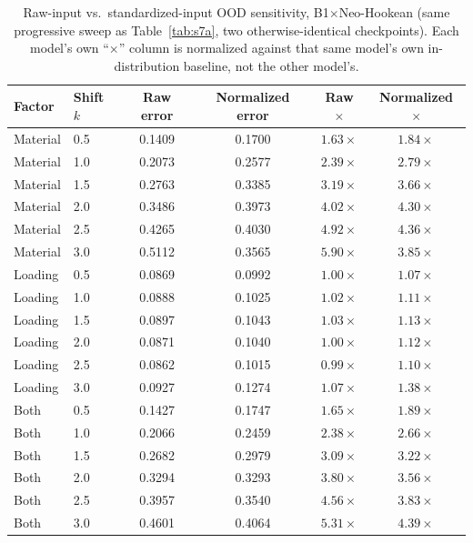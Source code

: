 \documentclass[11pt]{article}
\begin{document}
\begin{table}[h]
\centering
\caption{Raw-input vs.\ standardized-input OOD sensitivity, B1$\times$Neo-Hookean
  (same progressive sweep as Table~\ref{tab:s7a}, two otherwise-identical
  checkpoints). Each model's own ``$\times$'' column is normalized against
  that same model's own in-distribution baseline, not the other model's.}
\label{tab:s7b}
\small
\begin{tabular}{llcccc}
\toprule
Factor & Shift $k$ & Raw error & Normalized error & Raw $\times$ & Normalized $\times$ \\
\midrule
Material & 0.5 & 0.1409 & 0.1700 & $1.63\times$ & $1.84\times$ \\
Material & 1.0 & 0.2073 & 0.2577 & $2.39\times$ & $2.79\times$ \\
Material & 1.5 & 0.2763 & 0.3385 & $3.19\times$ & $3.66\times$ \\
Material & 2.0 & 0.3486 & 0.3973 & $4.02\times$ & $4.30\times$ \\
Material & 2.5 & 0.4265 & 0.4030 & $4.92\times$ & $4.36\times$ \\
Material & 3.0 & 0.5112 & 0.3565 & $5.90\times$ & $3.85\times$ \\
\midrule
Loading  & 0.5 & 0.0869 & 0.0992 & $1.00\times$ & $1.07\times$ \\
Loading  & 1.0 & 0.0888 & 0.1025 & $1.02\times$ & $1.11\times$ \\
Loading  & 1.5 & 0.0897 & 0.1043 & $1.03\times$ & $1.13\times$ \\
Loading  & 2.0 & 0.0871 & 0.1040 & $1.00\times$ & $1.12\times$ \\
Loading  & 2.5 & 0.0862 & 0.1015 & $0.99\times$ & $1.10\times$ \\
Loading  & 3.0 & 0.0927 & 0.1274 & $1.07\times$ & $1.38\times$ \\
\midrule
Both     & 0.5 & 0.1427 & 0.1747 & $1.65\times$ & $1.89\times$ \\
Both     & 1.0 & 0.2066 & 0.2459 & $2.38\times$ & $2.66\times$ \\
Both     & 1.5 & 0.2682 & 0.2979 & $3.09\times$ & $3.22\times$ \\
Both     & 2.0 & 0.3294 & 0.3293 & $3.80\times$ & $3.56\times$ \\
Both     & 2.5 & 0.3957 & 0.3540 & $4.56\times$ & $3.83\times$ \\
Both     & 3.0 & 0.4601 & 0.4064 & $5.31\times$ & $4.39\times$ \\
\bottomrule
\end{tabular}
\end{table}
\end{document}
